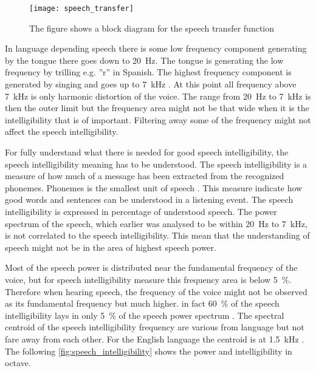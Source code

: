  \begin{figure}[H]
	\centering
		\texttt{[image: speech\_transfer]}
		\caption{The figure shows a block diagram for the speech transfer function \citep{pulkki2015}}
		\label{fig:speech_transfer_system}
\end{figure}

In language depending speech there is some low frequency component generating by the tongue there goes down to \SI{20}{\hertz}. The tongue is generating the low frequency by trilling e.g. ''r'' in Spanish. The highest frequency component is generated by singing and goes up to \SI{7}{\kilo\hertz} \citep{pulkki2015}. At this point all frequency above \SI{7}{\kilo\hertz} is only harmonic distortion of the voice. The range from \SI{20}{\hertz} to \SI{7}{\kilo\hertz} is then the outer limit but the frequency area might not be that wide when it is the intelligibility that is of important. Filtering away some of the frequency might not affect the speech intelligibility. 

For fully understand what there is needed for good speech intelligibility, the speech intelligibility meaning has to be understood. The speech intelligibility is a measure of how much of a message has been extracted from the recognized phonemes. Phonemes is the smallest unit of speech \citep{arl_us_army}. This measure indicate how good words and sentences can be understood in a listening event. The speech intelligibility  is expressed in percentage of understood speech. The power spectrum of the speech, which earlier was analysed to be within \SI{20}{\hertz} to \SI{7}{\kilo\hertz}, is not correlated to the speech intelligibility. This mean that the understanding of speech might not be in the area of highest speech power. 

Most of the speech power is distributed near the fundamental frequency of the voice, but for speech intelligibility measure this frequency area is below \SI{5}{\percent}. Therefore when hearing speech, the frequency of the voice might not be observed as its fundamental frequency but much higher. in fact \SI{60}{\percent} of the speech intelligibility lays in only \SI{5}{\percent} of the speech power spectrum \citep{arl_us_army}. The spectral centroid of the speech intelligibility frequency are various from language but not fare away from each other. For the English language the centroid is at \SI{1.5}{\kilo\hertz} \citep{arl_us_army}. The following \autoref{fig:speech_intelligibility} shows the power and intelligibility in octave. 

